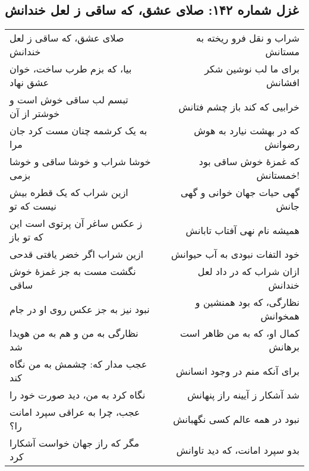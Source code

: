 \begin{center}
\section*{غزل شماره ۱۴۲: صلای عشق، که ساقی ز لعل خندانش}
\label{sec:142}
\begin{longtable}{l p{0.5cm} r}
صلای عشق، که ساقی ز لعل خندانش
&&
شراب و نقل فرو ریخته به مستانش
\\
بیا، که بزم طرب ساخت، خوان عشق نهاد
&&
برای ما لب نوشین شکر افشانش
\\
تبسم لب ساقی خوش است و خوشتر از آن
&&
خرابیی که کند باز چشم فتانش
\\
به یک کرشمه چنان مست کرد جان مرا
&&
که در بهشت نیارد به هوش رضوانش
\\
خوشا شراب و خوشا ساقی و خوشا بزمی
&&
که غمزهٔ خوش ساقی بود خمستانش!
\\
ازین شراب که یک قطره بیش نیست که تو
&&
گهی حیات جهان خوانی و گهی جانش
\\
ز عکس ساغر آن پرتوی است این که تو باز
&&
همیشه نام نهی آفتاب تابانش
\\
ازین شراب اگر خضر یافتی قدحی
&&
خود التفات نبودی به آب حیوانش
\\
نگشت مست به جز غمزهٔ خوش ساقی
&&
ازان شراب که در داد لعل خندانش
\\
نبود نیز به جز عکس روی او در جام
&&
نظارگی، که بود همنشین و همخوانش
\\
نظارگی به من و هم به من هویدا شد
&&
کمال او، که به من ظاهر است برهانش
\\
عجب مدار که: چشمش به من نگاه کند
&&
برای آنکه منم در وجود انسانش
\\
نگاه کرد به من، دید صورت خود را
&&
شد آشکار ز آیینه راز پنهانش
\\
عجب، چرا به عراقی سپرد امانت را؟
&&
نبود در همه عالم کسی نگهبانش
\\
مگر که راز جهان خواست آشکارا کرد
&&
بدو سپرد امانت، که دید تاوانش
\\
\end{longtable}
\end{center}
